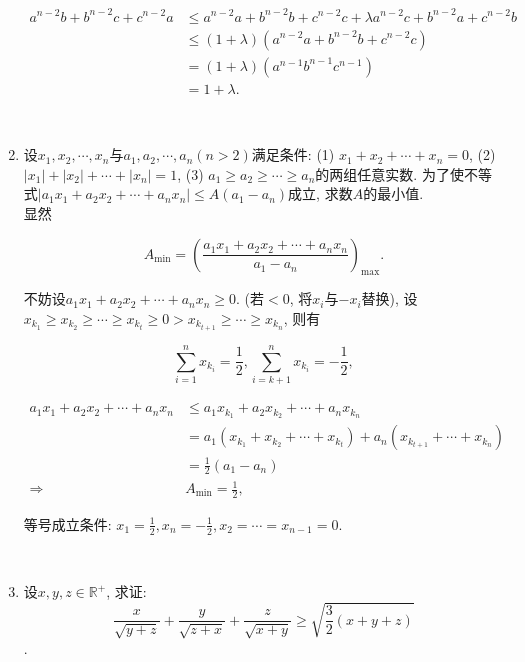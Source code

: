 \documentclass[8pt]{article}
\begin{document}
\begin{enumerate}
			\begin{align*}
				a^{n-2}b+b^{n-2}c+c^{n-2}a &\leq a^{n-2} a+b^{n-2} b+c^{n-2} c + \lambda{a^{n-2} c+b^{n-2} a+c^{n-2} b}\\
				&\leq (1+\lambda) \left(a^{n-2}a+b^{n-2}b+c^{n-2}c\right)\\
				&= (1+\lambda) \left(a^{n-1} b^{n-1} c^{n-1}\right)\\
				&= 1+\lambda.
			\end{align*}

		~\\

		\item 设$x_1, x_2, \cdots, x_n$与$a_1, a_2, \cdots, a_n (n>2)$满足条件: (1) $x_1 + x_2 + \cdots + x_n = 0$, (2) $|x_1|+|x_2|+\cdots+|x_n|=1$, (3) $a_1 \geq a_2 \geq \cdots \geq a_n$的两组任意实数. 为了使不等式$|a_1 x_1 + a_2 x_2 + \cdots + a_n x_n| \leq A(a_1 - a_n)$成立, 求数$A$的最小值.
			~\\

			显然

			$$A_{\min}=\left(\frac{a_1 x_1 + a_2 x_2 + \cdots + a_n x_n}{a_1 - a_n}\right)_{\max}.$$

			不妨设$a_1 x_1 + a_2 x_2 + \cdots + a_n x_n \geq 0$. (若$<0$, 将$x_i$与$-x_i$替换), 设$x_{k_1} \geq x_{k_2} \geq \cdots \geq x_{k_t} \geq 0 > x_{k_{t+1}} \geq \cdots \geq x_{k_n}$, 则有

			$$\sum_{i=1}^{n} x_{k_i}=\frac{1}{2}, \sum_{i=k+1}^{n} x_{k_i}=-\frac{1}{2},$$

			\begin{align*}
				a_1 x_1 + a_2 x_2 + \cdots + a_n x_n &\leq a_1 x_{k_1} + a_2 x_{k_2} + \cdots + a_n x_{k_n}\\
				&= a_1 (x_{k_1} + x_{k_2} + \cdots + x_{k_t}) + a_n (x_{k_{t+1}} + \cdots + x_{k_n})\\
				&= \frac{1}{2} (a_1 - a_n)\\
				\Rightarrow& A_{\min} = \frac{1}{2},
			\end{align*}

			等号成立条件: $\displaystyle x_1=\frac{1}{2}, x_n=-\frac{1}{2}, x_2 = \cdots = x_{n-1} = 0.$

		~\\

		\item 设$x, y, z \in \mathbb{R}^{+}$, 求证: $$\frac{x}{\sqrt{y+z}}+\frac{y}{\sqrt{z+x}}+\frac{z}{\sqrt{x+y}}\geq\sqrt{\frac{3}{2}(x+y+z)}$$.
			~\\


\end{enumerate}
\end{document}
